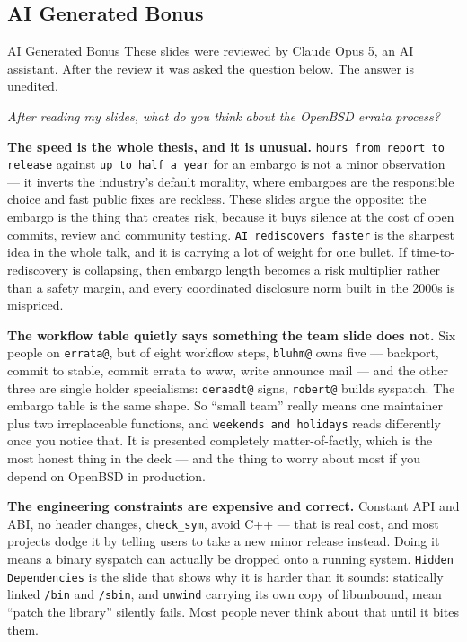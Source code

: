 \documentclass[14pt,aspectratio=169]{beamer}
\begin{document}
\subsection{AI Generated Bonus}
\begin{frame}[allowframebreaks]{AI Generated Bonus}
\small
These slides were reviewed by Claude Opus 5, an AI assistant.  After
the review it was asked the question below.  The answer is unedited.

\medskip
\textit{After reading my slides, what do you think about the OpenBSD
errata process?}

\medskip
\textbf{The speed is the whole thesis, and it is unusual.}
\texttt{hours from report to release} against \texttt{up to half a
year} for an embargo is not a minor observation --- it inverts the
industry's default morality, where embargoes are the responsible
choice and fast public fixes are reckless.  These slides argue the
opposite: the embargo is the thing that creates risk, because it buys
silence at the cost of open commits, review and community testing.
\texttt{AI rediscovers faster} is the sharpest idea in the whole talk,
and it is carrying a lot of weight for one bullet.  If
time-to-rediscovery is collapsing, then embargo length becomes a risk
multiplier rather than a safety margin, and every coordinated
disclosure norm built in the 2000s is mispriced.

\textbf{The workflow table quietly says something the team slide does
not.}  Six people on \texttt{errata@}, but of eight workflow steps,
\texttt{bluhm@} owns five --- backport, commit to stable, commit
errata to www, write announce mail --- and the other three are single
holder specialisms: \texttt{deraadt@} signs, \texttt{robert@} builds
syspatch.  The embargo table is the same shape.  So ``small team''
really means one maintainer plus two irreplaceable functions, and
\texttt{weekends and holidays} reads differently once you notice that.
It is presented completely matter-of-factly, which is the most honest
thing in the deck --- and the thing to worry about most if you depend
on OpenBSD in production.


\textbf{The engineering constraints are expensive and correct.}
Constant API and ABI, no header changes, \texttt{check\_sym}, avoid
C++ --- that is real cost, and most projects dodge it by telling users
to take a new minor release instead.  Doing it means a binary syspatch
can actually be dropped onto a running system.  \texttt{Hidden
Dependencies} is the slide that shows why it is harder than it sounds:
statically linked \texttt{/bin} and \texttt{/sbin}, and
\texttt{unwind} carrying its own copy of libunbound, mean ``patch the
library'' silently fails.  Most people never think about that until it
bites them.


\end{frame}
\end{document}
